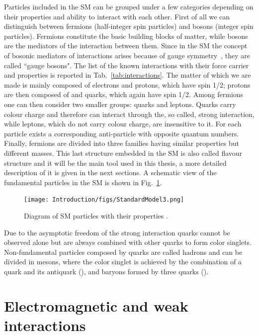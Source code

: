 Particles included in the SM can be grouped under a few categories depending on their properties and ability to interact with
each other. First of all we can distinguish between fermions (half-integer spin particles) and bosons (integer spin particles).
Fermions constitute the basic building blocks of matter, while bosons are the mediators of the interaction between them.
Since in the SM the concept of bosonic mediators of interactions arises because of gauge symmetry~\cite{Glashow:1961tr},
they are called ``gauge bosons". The list of the known interactions with their force carrier and properties is reported
in Tab.~\ref{tab:interactions}. The matter of which we are made is mainly composed of electrons and protons, which have spin 1/2;
protons are then composed of \uquark and \dquark quarks, which again have spin 1/2. Among fermions one can then consider two smaller
groups: quarks and leptons. Quarks carry colour charge and therefore can interact through the, so called, strong interaction,
while leptons, which do not carry colour charge, are insensitive to it.
For each particle exists a corresponding anti-particle with opposite quantum numbers.
Finally, fermions are divided into three families having similar properties but different masses.
This last structure embedded in the SM is also called flavour structure and it will be the main tool
used in this thesis, a more detailed description of it is given in the next sections.
A schematic view of the fundamental particles in the SM is shown in Fig.~\ref{fig:SMparticles}.
%
\begin{figure}[h]
\centering
\texttt{[image: Introduction/figs/StandardModel3.png]}
\caption{Diagram of SM particles with their properties \cite{SMimage}.}
\label{fig:SMparticles}
\end{figure}
%
Due to the asymptotic freedom of the strong interaction quarks cannot be observed alone but
are always combined with other quarks to form color singlets. Non-fundamental particles
composed by quarks are called hadrons and can be divided in mesons, where the color singlet
is achieved by the combination of a quark and its antiquark (\quark\quarkbar), and baryons
formed by three quarks (\quark\quark\quark). 


\section{Electromagnetic and weak interactions}

